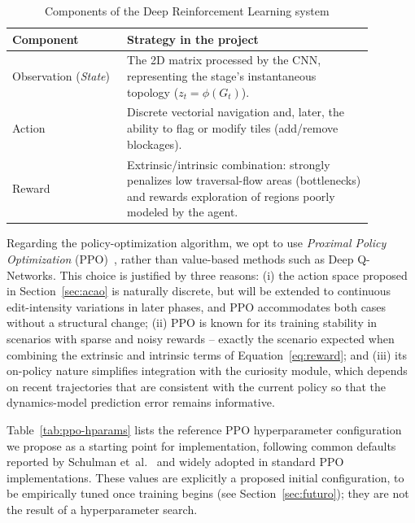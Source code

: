 \documentclass[sigconf,nonacm,language=english]{acmart}
\begin{document}
\begin{table}
  \caption{Components of the Deep Reinforcement Learning system}
  \label{tab:drl}
  \begin{tabular}{p{0.28\linewidth}p{0.6\linewidth}}
    \toprule
    \textbf{Component} & \textbf{Strategy in the project} \\
    \midrule
    Observation (\emph{State}) & The 2D matrix processed by the CNN,
      representing the stage's instantaneous topology ($z_t = \phi(G_t)$). \\
    Action & Discrete vectorial navigation and, later, the ability to flag
      or modify tiles (add/remove blockages). \\
    Reward & Extrinsic/intrinsic combination: strongly penalizes low
      traversal-flow areas (bottlenecks) and rewards exploration of
      regions poorly modeled by the agent. \\
    \bottomrule
  \end{tabular}
\end{table}

Regarding the policy-optimization algorithm, we opt to use \emph{Proximal
Policy Optimization} (PPO)~\cite{schulman2017proximal}, rather than
value-based methods such as Deep Q-Networks. This choice is justified by
three reasons: (i) the action space proposed in Section~\ref{sec:acao} is
naturally discrete, but will be extended to continuous edit-intensity
variations in later phases, and PPO accommodates both cases without a
structural change; (ii) PPO is known for its training stability in
scenarios with sparse and noisy rewards -- exactly the scenario expected
when combining the extrinsic and intrinsic terms of
Equation~\eqref{eq:reward}; and (iii) its on-policy nature simplifies
integration with the curiosity module, which depends on recent
trajectories that are consistent with the current policy so that the
dynamics-model prediction error remains informative.

Table~\ref{tab:ppo-hparams} lists the reference PPO hyperparameter
configuration we propose as a starting point for implementation, following
common defaults reported by Schulman et~al.~\cite{schulman2017proximal} and
widely adopted in standard PPO implementations. These values are
explicitly a proposed initial configuration, to be empirically tuned once
training begins (see Section~\ref{sec:futuro}); they are not the result of
a hyperparameter search.
\end{document}
